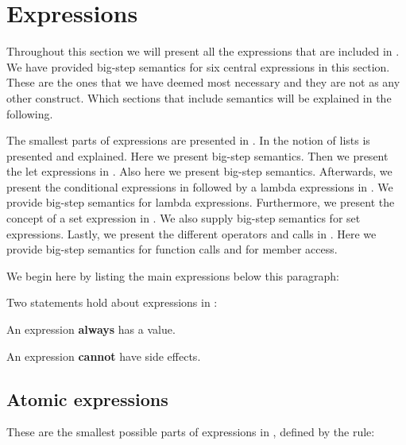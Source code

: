 \section{Expressions}
\label{sec:expressions}

Throughout this section we will present all the expressions that are included in
\productname{}. We have provided big-step semantics for six central expressions
in this section. These are the ones that we have deemed most necessary and they
are not as any other construct. Which sections that include semantics will be
explained in the following.

The smallest parts of expressions are presented in
. In  the notion of
lists is presented and explained. Here we present big-step semantics. Then we
present the let expressions in . Also here we present
big-step semantics. Afterwards, we present the conditional expressions in 
 followed by a lambda expressions in
. We provide big-step semantics for lambda
expressions. Furthermore, we present the concept of a set expression in
. We also supply big-step semantics for set
expressions. Lastly, we present the different operators and calls in
. Here we provide big-step semantics for function
calls and for member access.

We begin here by listing the main expressions below this
paragraph:

\begin{ebnf}
\end{ebnf}

Two statements hold about expressions in \productname{}:

\begin{nlist}
\item An expression \textbf{always} has a value.
\item An expression \textbf{cannot} have side effects.
\end{nlist}

\subsection{Atomic expressions}
\label{sec:atomicexpressions}

These are the smallest possible parts of expressions in \productname{}, defined by
the rule:

